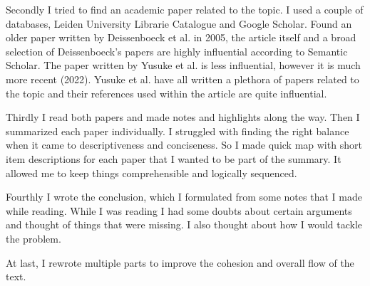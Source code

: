 \documentclass[a4paper,12pt]{article}
\begin{document}
\begin{multicols}{2}
Secondly I tried to find an academic paper related to the topic. I used a couple of databases, Leiden University Librarie Catalogue and Google Scholar. Found an older paper written by Deissenboeck et al. in 2005, the article itself and a broad selection of Deissenboeck's papers are highly influential according to Semantic Scholar. The paper written by Yusuke et al. is less influential, however it is much more recent (2022). Yusuke et al. have all written a plethora of papers related to the topic and their references used within the article are quite influential. 

Thirdly I read both papers and made notes and highlights along the way. Then I summarized each paper individually. I struggled with finding the right balance when it came to descriptiveness and conciseness. So I made quick map with short item descriptions for each paper that I wanted to be part of the summary. It allowed me to keep things comprehensible and logically sequenced. 

Fourthly I wrote the conclusion, which I formulated from some notes that I made while reading. While I was reading I had some doubts about certain arguments and thought of things that were missing. I also thought about how I would tackle the problem.

At last, I rewrote multiple parts to improve the cohesion and overall flow of the text.

\end{multicols}

\printbibliography
\end{document}
